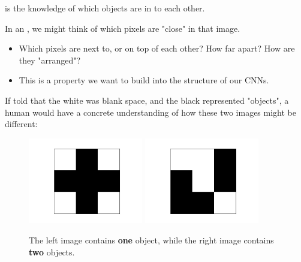         \begin{definition}
             is the knowledge of which objects are  in  to each other.

            In an , we might think of which pixels are "close" in that image.
                \begin{itemize}
                    \item Which pixels are next to, or on top of each other? How far apart? How are they "arranged"?
                \end{itemize}

            \subsecdiv

            \begin{itemize}
                \item This is a property we want to build into the structure of our CNNs.
            \end{itemize}
        \end{definition}

        \miniex If told that the white was blank space, and the black represented "objects", a human would have a concrete understanding of how these two images might be different:

        \begin{figure}[H]
            \centering
            \includegraphics[width=50mm,scale=0.5]{images/convolutional_neural_networks_images/crossgrid.png}
            \includegraphics[width=50mm,scale=0.5]{images/convolutional_neural_networks_images/notcross_3.png}
            
            \caption*{The left image contains \textbf{one} object, while the right image contains \textbf{two} objects.}
        \end{figure}


